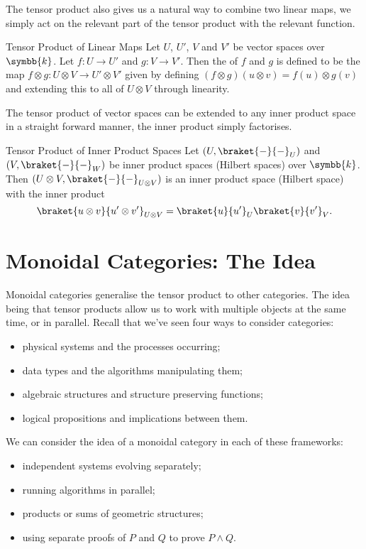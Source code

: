 \documentclass[fleqn]{NotesClass}
\renewcommand{\field}{\symbb{k}}
\begin{document}
    The tensor product also gives us a natural way to combine two linear maps, we simply act on the relevant part of the tensor product with the relevant function.
    
    \begin{dfn}{Tensor Product of Linear Maps}{}
        Let \(U\), \(U'\), \(V\) and \(V'\) be vector spaces over \(\field\).
        Let \(f \colon U \to U'\) and \(g \colon V \to V'\).
        Then the  of \(f\) and \(g\) is defined to be the map \(f \otimes g \colon U \otimes V \to U' \otimes V'\) given by defining \((f \otimes g)(u \otimes v) = f(u) \otimes g(v)\) and extending this to all of \(U \otimes V\) through linearity.
    \end{dfn}
    
    The tensor product of vector spaces can be extended to any inner product space in a straight forward manner, the inner product simply factorises.
    
    \begin{dfn}{Tensor Product of Inner Product Spaces}{}
        Let \((U, \braket{-}{-}_U)\) and \((V, \braket{-}{-}_W)\) be inner product spaces (Hilbert spaces) over \(\field\).
        Then \((U \otimes V, \braket{-}{-}_{U \otimes V})\) is an inner product space (Hilbert space) with the inner product
        \begin{equation}
            \braket{u \otimes v}{u' \otimes v'}_{U \otimes V} = \braket{u}{u'}_U \braket{v}{v'}_V.
        \end{equation}
    \end{dfn}
    
    \section{Monoidal Categories: The Idea}
    Monoidal categories generalise the tensor product to other categories.
    The idea being that tensor products allow us to work with multiple objects at the same time, or in parallel.
    Recall that we've seen four ways to consider categories:
    \begin{itemize}
        \item physical systems and the processes occurring;
        \item data types and the algorithms manipulating them;
        \item algebraic structures and structure preserving functions;
        \item logical propositions and implications between them.
    \end{itemize}
    We can consider the idea of a monoidal category in each of these frameworks:
    \begin{itemize}
        \item independent systems evolving separately;
        \item running algorithms in parallel;
        \item products or sums of geometric structures;
        \item using separate proofs of \(P\) and \(Q\) to prove \(P \land Q\).
    \end{itemize}
    
\end{document}
